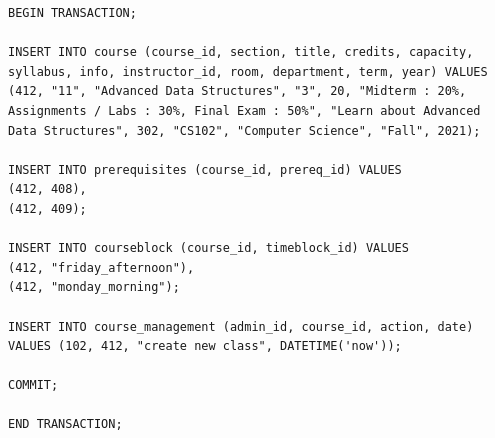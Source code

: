 \documentclass{report}
\begin{document}
\begin{lstlisting}
BEGIN TRANSACTION;

INSERT INTO course (course_id, section, title, credits, capacity, syllabus, info, instructor_id, room, department, term, year) VALUES
(412, "11", "Advanced Data Structures", "3", 20, "Midterm : 20%, Assignments / Labs : 30%, Final Exam : 50%", "Learn about Advanced Data Structures", 302, "CS102", "Computer Science", "Fall", 2021);

INSERT INTO prerequisites (course_id, prereq_id) VALUES
(412, 408),
(412, 409);

INSERT INTO courseblock (course_id, timeblock_id) VALUES
(412, "friday_afternoon"),
(412, "monday_morning");

INSERT INTO course_management (admin_id, course_id, action, date)
VALUES (102, 412, "create new class", DATETIME('now'));

COMMIT;

END TRANSACTION;
\end{lstlisting}
\end{document}
